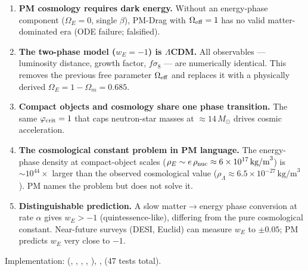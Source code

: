 \documentclass[10pt,twocolumn]{article}
\begin{document}
\begin{enumerate}
  \item \textbf{PM cosmology requires dark energy.}  Without an energy-phase
        component ($\Omega_E=0$, single $\beta$), PM-Drag with $\Omega_{\rm eff}=1$
        has no valid matter-dominated era (ODE failure; falsified).
  \item \textbf{The two-phase model ($w_E=-1$) is $\Lambda$CDM.}  All
        observables — luminosity distance, growth factor, $f\sigma_8$ — are
        numerically identical.  This removes the previous free parameter
        $\Omega_{\rm eff}$ and replaces it with a physically derived
        $\Omega_E = 1 - \Omega_m = 0.685$.
  \item \textbf{Compact objects and cosmology share one phase transition.}
        The same $\varphi_{\rm crit}=1$ that caps neutron-star masses at
        $\approx 14\,M_\odot$ drives cosmic acceleration.
  \item \textbf{The cosmological constant problem in PM language.}
        The energy-phase density at compact-object scales
        ($\rho_E\sim e\,\rho_{\rm nuc}\approx6\times10^{17}\,\text{kg/m}^3$)
        is $\sim10^{44}\times$ larger than the observed cosmological value
        ($\rho_\Lambda\approx6.5\times10^{-27}\,\text{kg/m}^3$).
        PM names the problem but does not solve it.
  \item \textbf{Distinguishable prediction.}  A slow matter$\to$energy phase
        conversion at rate $\alpha$ gives $w_E>-1$ (quintessence-like), differing
        from the pure cosmological constant.  Near-future surveys (DESI, Euclid)
        can measure $w_E$ to $\pm0.05$; PM predicts $w_E$ very close to $-1$.
\end{enumerate}

Implementation:
 (,
, ,
, ),
,
 (47 tests total).

\end{document}

